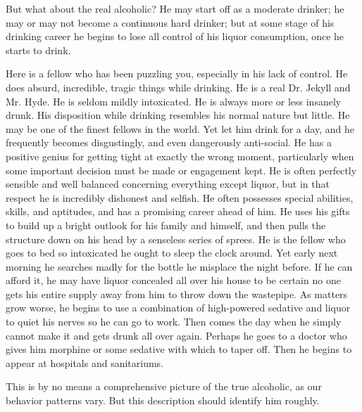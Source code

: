 \begin{biblechapter}

But what about the real alcoholic? 
He may start off as a moderate drinker; 
he may or may not become a continuous hard drinker; 
but at some stage of his drinking career he begins to lose all control of his liquor consumption, 
once he starts to drink.

Here is a fellow who has been puzzling you, especially in his lack of control. 
He does absurd, incredible, tragic things while drinking. 
He is a real Dr. Jekyll and Mr. Hyde. 
He is seldom mildly intoxicated. 
He is always more or less insanely drunk. 
His disposition while drinking resembles his normal nature but little. 
He may be one of the finest fellows in the world. 
Yet let him drink for a day, and he frequently becomes disgustingly, and even dangerously anti-social. 
He has a positive genius for getting tight at exactly the wrong moment, 
particularly when some important decision must be made or engagement kept. 
He is often perfectly sensible and well balanced concerning everything except liquor, 
but in that respect he is incredibly dishonest and selfish. 
He often possesses special abilities, skills, and aptitudes, 
and has a promising career ahead of him. 
He uses his gifts to build up a bright outlook for his family and himself, 
and then pulls the structure down on his head by a senseless series of sprees. 
He is the fellow who goes to bed so intoxicated he ought to sleep the clock around. 
Yet early next morning he searches madly for the bottle he misplace the night before. 
If he can afford it, he may have liquor concealed all over his house to be certain no one gets his entire supply away from him to throw down the wastepipe. 
As matters grow worse, he begins to use a combination of high-powered sedative and liquor to quiet his nerves so he can go to work. 
Then comes the day when he simply cannot make it and gets drunk all over again. 
Perhaps he goes to a doctor who gives him morphine or some sedative with which to taper off. 
Then he begins to appear at hospitals and sanitariums.

This is by no means a comprehensive picture of the true alcoholic, as our behavior patterns vary. 
But this description should identify him roughly.
\end{biblechapter}


